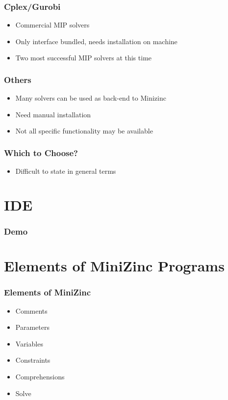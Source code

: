 \begin{frame}
  \frametitle{Cplex/Gurobi}
  \begin{itemize}
  \item Commercial MIP solvers
  \item Only interface bundled, needs installation on machine
    \item Two most successful MIP solvers at this time
  \end{itemize}
\end{frame}

\begin{frame}
  \frametitle{Others}
  \begin{itemize}
\item Many solvers can be used as back-end to Minizinc
\item Need manual installation
  \item Not all specific functionality may be available
\end{itemize}
\end{frame}

\begin{frame}
  \frametitle{Which to Choose?}
  \begin{itemize}
  \item Difficult to state in general terms
  \end{itemize}
\end{frame}

\section{IDE}

\begin{frame}
  \frametitle{Demo}
\end{frame}

\section{Elements of MiniZinc Programs}

\begin{frame}
  \frametitle{Elements of MiniZinc}
  \begin{itemize}
  \item Comments
  \item Parameters
  \item Variables
  \item Constraints
    \item Comprehensions
  \item Solve
  \end{itemize}
\end{frame}

